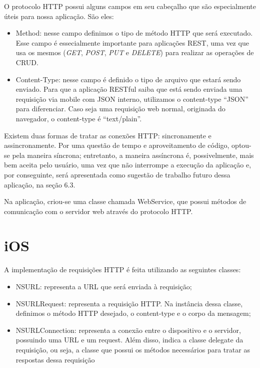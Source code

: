	O protocolo \ac{HTTP} possui alguns campos em seu cabeçalho que são especialmente úteis para nossa aplicação. São eles:
\begin{itemize}
\item Method: nesse campo definimos o tipo de método \ac{HTTP} que será executado. Esse campo é essecialmente importante para aplicações \ac{REST}, uma vez que usa os mesmos (\emph{GET}, \emph{POST}, \emph{PUT} e \emph{DELETE}) para realizar as operações de \ac{CRUD}.
\item Content-Type: nesse campo é definido o tipo de arquivo que estará sendo enviado. Para que a aplicação RESTful saiba que está sendo enviada uma requisição via mobile com \ac{JSON} interno, utilizamos o content-type ``JSON'' para diferenciar. Caso seja uma requisição web normal, originada do navegador, o content-type é ``text/plain''.
\end{itemize}     
   
    Existem duas formas de tratar as conexões \ac{HTTP}: sincronamente e assincronamente. Por uma questão de tempo e aproveitamento de código, optou-se pela maneira síncrona; entretanto, a maneira assíncrona é, possivelmente, mais bem aceita pelo usuário, uma vez que não interrompe a execução da aplicação e, por conseguinte, será apresentada como sugestão de trabalho futuro dessa aplicação, na seção 6.3.
    
	Na aplicação, criou-se uma classe chamada WebService, que possui métodos de comunicação com o servidor web através do protocolo \ac{HTTP}.
     
    \section{iOS}
     
            A implementação de requisições \ac{HTTP} é feita utilizando as seguintes classes:
\begin{itemize}
\item NSURL: representa a \ac{URL} que será enviada à requisição;
\item NSURLRequest: representa a requisição \ac{HTTP}. Na instância dessa classe, definimos o método \ac{HTTP} desejado, o content-type e o corpo da mensagem;
\item NSURLConnection: representa a conexão entre o dispositivo e o servidor, possuindo uma \ac{URL} e um request. Além disso, indica a classe delegate da requisição, ou seja, a classe que possui os métodos necessários para tratar as respostas dessa requisição
\end{itemize}
     
